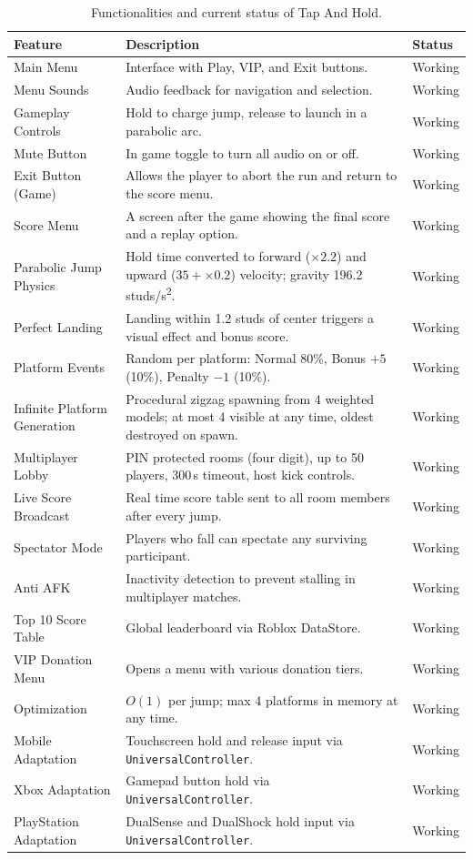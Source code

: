 \documentclass[12pt,letterpaper]{article}
\begin{document}
\begin{table}[H]
\centering
\begin{tabular}{|p{4cm}|p{8cm}|p{2.5cm}|}
\hline
\textbf{Feature} & \textbf{Description} & \textbf{Status} \\
\hline
Main Menu & Interface with Play, VIP, and Exit buttons. & Working \\
\hline
Menu Sounds & Audio feedback for navigation and selection. & Working \\
\hline
Gameplay Controls & Hold to charge jump, release to launch in a parabolic arc. & Working \\
\hline
Mute Button & In game toggle to turn all audio on or off. & Working \\
\hline
Exit Button (Game) & Allows the player to abort the run and return to the score menu. & Working \\
\hline
Score Menu & A screen after the game showing the final score and a replay option. & Working \\
\hline
Parabolic Jump Physics & Hold time converted to forward ($\times 2.2$) and upward ($35 + \times 0.2$) velocity; gravity 196.2\,studs/s\textsuperscript{2}. & Working \\
\hline
Perfect Landing & Landing within 1.2 studs of center triggers a visual effect and bonus score. & Working \\
\hline
Platform Events & Random per platform: Normal 80\%, Bonus $+5$ (10\%), Penalty $-1$ (10\%). & Working \\
\hline
Infinite Platform Generation & Procedural zigzag spawning from 4 weighted models; at most 4 visible at any time, oldest destroyed on spawn. & Working \\
\hline
Multiplayer Lobby & PIN protected rooms (four digit), up to 50 players, 300\,s timeout, host kick controls. & Working \\
\hline
Live Score Broadcast & Real time score table sent to all room members after every jump. & Working \\
\hline
Spectator Mode & Players who fall can spectate any surviving participant. & Working \\
\hline
Anti AFK & Inactivity detection to prevent stalling in multiplayer matches. & Working \\
\hline
Top 10 Score Table & Global leaderboard via Roblox DataStore. & Working \\
\hline
VIP Donation Menu & Opens a menu with various donation tiers. & Working \\
\hline
Optimization & $O(1)$ per jump; max 4 platforms in memory at any time. & Working \\
\hline
Mobile Adaptation & Touchscreen hold and release input via \texttt{UniversalController}. & Working \\
\hline
Xbox Adaptation & Gamepad button hold via \texttt{UniversalController}. & Working \\
\hline
PlayStation Adaptation & DualSense and DualShock hold input via \texttt{UniversalController}. & Working \\
\hline
\end{tabular}
\caption{Functionalities and current status of Tap And Hold.}
\end{table}
\end{document}
